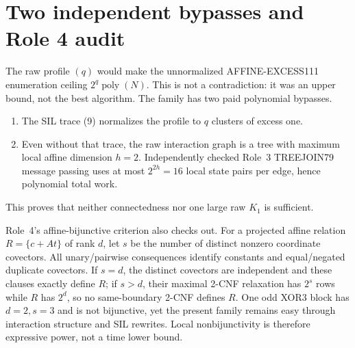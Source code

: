 \documentclass[11pt]{article}
\begin{document}
\section{Two independent bypasses and Role 4 audit}
The raw profile $(q)$ would make the unnormalized AFFINE-EXCESS111 enumeration
ceiling $2^q\operatorname{poly}(N)$.  This is not a contradiction: it was an
upper bound, not the best algorithm.  The family has two paid polynomial
bypasses.
\begin{enumerate}
\item The SIL trace (9) normalizes the profile to $q$ clusters of excess one.
\item Even without that trace, the raw interaction graph is a tree with
maximum local affine dimension $h=2$.  Independently checked Role~3
TREEJOIN79 message passing uses at most $2^{2h}=16$ local state pairs per
edge, hence polynomial total work.
\end{enumerate}
This proves that neither connectedness nor one large raw $K_1$ is sufficient.

Role~4's affine-bijunctive criterion also checks out.  For a projected affine
relation $R=\{c+At\}$ of rank $d$, let $s$ be the number of distinct nonzero
coordinate covectors.  All unary/pairwise consequences identify constants
and equal/negated duplicate covectors.  If $s=d$, the distinct covectors are
independent and these clauses exactly define $R$; if $s>d$, their maximal
2-CNF relaxation has $2^s$ rows while $R$ has $2^d$, so no same-boundary
2-CNF defines $R$.  One odd XOR3 block has $d=2,s=3$ and is not bijunctive,
yet the present family remains easy through interaction structure and SIL
rewrites.  Local nonbijunctivity is therefore expressive power, not a time
lower bound.
\end{document}
